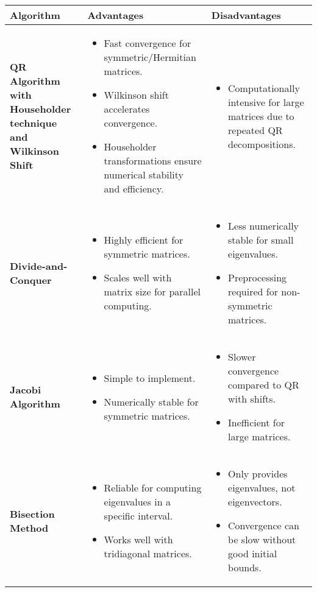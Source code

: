 \begin{tabular}{|p{3cm}|p{4.5cm}|p{7.5cm}|}
\hline
\textbf{Algorithm} & \textbf{Advantages} & \textbf{Disadvantages} \\ 
\hline
\textbf{QR Algorithm with Householder technique and Wilkinson Shift} 
& 
\begin{itemize}
    \item Fast convergence for symmetric/Hermitian matrices.
    \item Wilkinson shift accelerates convergence.
    \item Householder transformations ensure numerical stability and efficiency.
\end{itemize}
& 
\begin{itemize}
    \item Computationally intensive for large matrices due to repeated QR decompositions.
\end{itemize} \\\hline
\textbf{Divide-and-Conquer}
& 
\begin{itemize}
    \item Highly efficient for symmetric matrices.
    \item Scales well with matrix size for parallel computing.
\end{itemize}
& 
\begin{itemize}
    \item Less numerically stable for small eigenvalues.
    \item Preprocessing required for non-symmetric matrices.
\end{itemize} \\\hline

\textbf{Jacobi Algorithm}
& 
\begin{itemize}
    \item Simple to implement.
    \item Numerically stable for symmetric matrices.
\end{itemize}
& 
\begin{itemize}
    \item Slower convergence compared to QR with shifts.
    \item Inefficient for large matrices.
\end{itemize} \\\hline

\textbf{Bisection Method}
& 
\begin{itemize}
    \item Reliable for computing eigenvalues in a specific interval.
    \item Works well with tridiagonal matrices.
\end{itemize}
& 
\begin{itemize}
    \item Only provides eigenvalues, not eigenvectors.
    \item Convergence can be slow without good initial bounds.
\end{itemize} \\\hline


\end{tabular}
